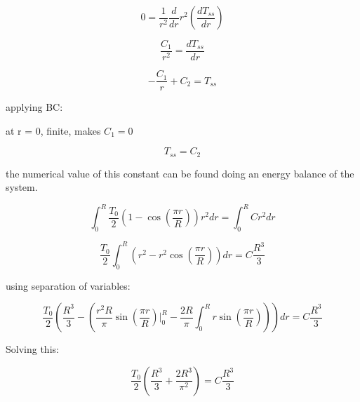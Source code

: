 \documentclass[12pt,letterpaper]{article}
\begin{document}
\[0 = \frac{1}{r^2} \frac{d}{dr} r^2 (\frac{dT_{ss}}{dr})\]

\[\frac{C_1}{r^2} = \frac{dT_{ss}}{dr}\]

\[-\frac{C_1}{r} + C_2 = T_{ss}\]

applying BC:

at r = 0, finite, makes  $C_1 = 0$

\[T_{ss} = C_2\]

the numerical value of this constant can be found doing an energy balance
of the system.

\[\int_{0}^{R} \frac{T_0}{2} (1-\cos(\frac{\pi r}{R})) r^2 dr = \int_{0}^{R} C r^2 dr \]

\[\frac{T_0}{2} \int_{0}^{R}  (r^2-r^2\cos(\frac{\pi r}{R})) dr = C \frac{R^3}{3} \]

using separation of variables:

\[\frac{T_0}{2} ( \frac{R^3}{3} - (\frac{r^2 R}{\pi} \sin(\frac{\pi r}{R})\Big|_0^R - \frac{2R}{\pi} \int_0^R r \sin(\frac{\pi r}{R})))dr = C \frac{R^3}{3}\]

Solving this:

\[\frac{T_0}{2} (\frac{R^3}{3} + \frac{2R^3}{\pi ^2}) = C \frac{R^3}{3} \]
\end{document}
